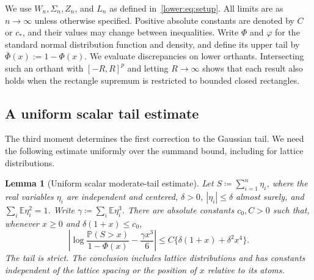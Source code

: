 \documentclass[11pt,letterpaper]{article}
\newtheorem{lemma}{Lemma}
\theoremstyle{remark}
\newcommand{\E}{\mathbb E}
\newcommand{\Pp}{\mathbb P}
\begin{document}
We use \(W_n,\Sigma_n,Z_n\), and \(L_n\) as defined
in~\eqref{lower:eq:setup}. All limits are as \(n\to\infty\) unless
otherwise specified. Positive absolute constants are denoted by
\(C\) or \(c_*\), and their values may change between inequalities.
Write \(\Phi\) and \(\varphi\) for the standard normal distribution
function and density, and define its upper tail by
\(\bar\Phi(x):=1-\Phi(x)\).
We evaluate discrepancies on lower orthants. Intersecting such an
orthant with \([-R,R]^p\) and letting \(R\to\infty\) shows that each
result also holds when the rectangle supremum is restricted to bounded
closed rectangles.

\subsection{A uniform scalar tail estimate}
\label{app:moderate-tail-proof}
The third moment determines the first correction to the Gaussian
tail. We need the following estimate uniformly over the summand
bound, including for lattice distributions.

\begin{lemma}[Uniform scalar moderate-tail estimate]
\label{opt:moderate-tail}
Let \(S\coloneqq\sum_{i=1}^n\eta_i\), where the real variables \(\eta_i\) are
independent and centered, \(\delta>0\), \(|\eta_i|\le\delta\)
almost surely, and
\(\sum_i\E\eta_i^2=1\). Write
\(\gamma\coloneqq\sum_i\E\eta_i^3\). There are absolute constants \({c_0},C>0\)
such that, whenever \(x\ge0\) and \(\delta(1+x)\le {c_0}\),
\begin{equation}
 \left|\log\frac{\Pp(S>x)}{1-\Phi(x)}
       -\frac{\gamma x^3}{6}\right|
 \le C\{\delta(1+x)+\delta^2x^4\}.
 \label{opt:moderate-tail-formula}
\end{equation}
The tail is strict. The conclusion includes lattice distributions and
has constants independent of the lattice spacing or the position of
\(x\) relative to its atoms.
\end{lemma}
\end{document}
